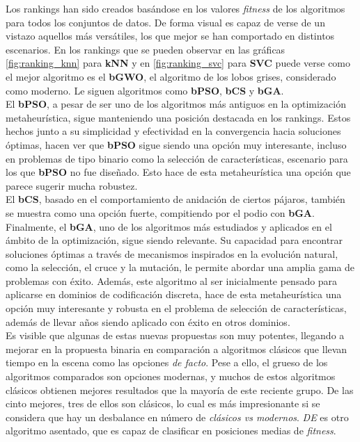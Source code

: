 Los rankings han sido creados basándose en los valores \textit{fitness} de los algoritmos para todos los conjuntos de datos. De forma visual es capaz de verse de un vistazo aquellos más versátiles, los que mejor se han comportado en distintos escenarios. En los rankings que se pueden observar en las gráficas \ref{fig:ranking_knn} para \textbf{kNN} y en \ref{fig:ranking_svc} para \textbf{SVC} puede verse como el mejor algoritmo es el \textbf{bGWO}, el algoritmo de los lobos grises, considerado como moderno. Le siguen algoritmos como \textbf{bPSO}, \textbf{bCS} y \textbf{bGA}.\\[6pt]

El \textbf{bPSO}, a pesar de ser uno de los algoritmos más antiguos en la optimización metaheurística, sigue manteniendo una posición destacada en los rankings. Estos hechos junto a su simplicidad y efectividad en la convergencia hacia soluciones óptimas, hacen ver que \textbf{bPSO} sigue siendo una opción muy interesante, incluso en problemas de tipo binario como la selección de características, escenario para los que \textbf{bPSO} no fue diseñado. Esto hace de esta metaheurística una opción que parece sugerir mucha robustez.\\[6pt]

El \textbf{bCS}, basado en el comportamiento de anidación de ciertos pájaros, también se muestra como una opción fuerte, compitiendo por el podio con \textbf{bGA}.\\[6pt]

Finalmente, el \textbf{bGA}, uno de los algoritmos más estudiados y aplicados en el ámbito de la optimización, sigue siendo relevante. Su capacidad para encontrar soluciones óptimas a través de mecanismos inspirados en la evolución natural, como la selección, el cruce y la mutación, le permite abordar una amplia gama de problemas con éxito. Además, este algoritmo al ser inicialmente pensado para aplicarse en dominios de codificación discreta, hace de esta metaheurística una opción muy interesante y robusta en el problema de selección de características, además de llevar años siendo aplicado con éxito en otros dominios.\\[6pt]

Es visible que algunas de estas nuevas propuestas son muy potentes, llegando a mejorar en la propuesta binaria en comparación a algoritmos clásicos que llevan tiempo en la escena como las opciones \textit{de facto}. Pese a ello, el grueso de los algoritmos comparados son opciones modernas, y muchos de estos algoritmos clásicos obtienen mejores resultados que la mayoría de este reciente grupo. De las cinto mejores, tres de ellos son clásicos, lo cual es más impresionante si se considera que hay un desbalance en número de \textit{clásicos vs modernos}. \textit{DE} es otro algoritmo asentado, que es capaz de clasificar en posiciones medias de \textit{fitness}.\\[6pt]

